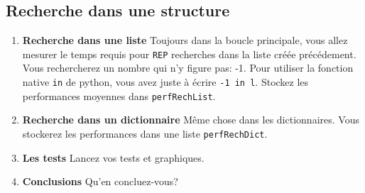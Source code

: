 \documentclass[11pt,a4paper]{article}
\newcommand{\checkbox}{$\square$ \smallskip}
\newcounter{exo} \setcounter{exo}{0}
\newenvironment{action}{%
    \begin{enumerate}[\numerotation] \addtocounter{exo}{-1}%
        }{%
    \end{enumerate}
}
\newcommand{\numexoa}{\theexo \addtocounter{exo}{1}}
\newcommand{\numerotation}{\checkbox \smallskip \numexoa.}
\begin{document}
\subsection*{Recherche dans une structure}
\begin{action}
\item {\bf Recherche dans une liste} Toujours dans la boucle principale, vous allez mesurer le temps requis pour {\tt REP} recherches dans la liste créée précédement. Vous rechercherez un nombre qui n'y figure pas: -1. Pour utiliser la fonction native {\tt in} de python, vous avez juste à écrire {\tt -1 in l}. Stockez les performances moyennes dans {\tt perfRechList}.
\item {\bf Recherche dans un dictionnaire} Même chose dans les dictionnaires. Vous stockerez les performances dans une liste {\tt perfRechDict}.
\item {\bf Les tests} Lancez vos tests et graphiques.
\item {\bf Conclusions} Qu'en concluez-vous?
\end{action}
\end{document}
